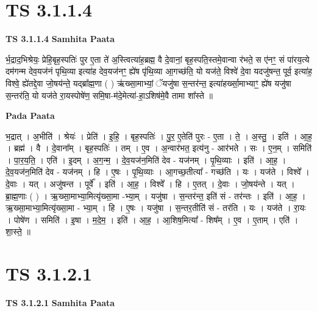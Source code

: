 \documentclass[17pt]{extarticle}
\begin{document}
\section*{ TS 3.1.1.4 }

\textbf{TS 3.1.1.4 } \newline
\textbf{Samhita Paata} \newline

र्भ॒द्राद॒भिश्रेयः॒ प्रेहि॒बृह॒स्पतिः॑ पुर ए॒ता ते॑ अ॒स्त्वित्या॑ह॒ब्रह्म॒ वै दे॒वानां॒ बृह॒स्पति॒स्तमे॒वान्वा र॑भते॒ स ए॑नꣳ॒॒ सं पा॑रय॒त्ये दम॑गन्म देव॒यज॑नं पृथि॒व्या इत्या॑ह देव॒यज॑नꣳ॒॒ ह्ये॑ष पृ॑थि॒व्या आ॒गच्छ॑ति॒ यो यज॑ते॒ विश्वे॑ दे॒वा यदजु॑षन्त॒ पूर्व॒ इत्या॑ह॒ विश्वे॒ ह्ये॑तद्दे॒वा जो॒षय॑न्ते॒ यद्ब्रा᳚ह्म॒णा ( ) ऋ॑ख्सा॒माभ्यां॒ ॅयजु॑षा स॒न्तर॑न्त॒ इत्या॑हर्ख्सा॒माभ्याꣳ॒॒ ह्ये॑ष यजु॑षा स॒न्तर॑ति॒ यो यज॑ते रा॒यस्पोषे॑ण॒ समि॒षा-म॑दे॒मेत्या॑-हा॒ऽशिष॑मे॒वै तामा शा᳚स्ते ॥ \newline

\textbf{Pada Paata} \newline

भ॒द्रात् । अ॒भीति॑ । श्रेयः॑ । प्रेति॑ । इ॒हि॒ । बृह॒स्पतिः॑ । पु॒र॒ ए॒तेति॑ पुरः - ए॒ता । ते॒ । अ॒स्तु॒ । इति॑ । आ॒ह॒ । ब्रह्म॑ । वै । दे॒वाना᳚म् । बृह॒स्पतिः॑ । तम् । ए॒व । अ॒न्वार॑भत॒ इत्य॑नु - आर॑भते । सः । ए॒न॒म् । समिति॑ । पा॒र॒य॒ति॒ । एति॑ । इ॒दम् । अ॒ग॒न्म॒ । दे॒व॒यज॑न॒मिति॑ देव - यज॑नम् । पृ॒थि॒व्याः । इति॑ । आ॒ह॒ । दे॒व॒यज॑न॒मिति॑ देव - यज॑नम् । हि । ए॒षः । पृ॒थि॒व्याः । आ॒गच्छ॒तीत्या᳚ - गच्छ॑ति । यः । यज॑ते । विश्वे᳚ । दे॒वाः । यत् । अजु॑षन्त । पूर्वे᳚ । इति॑ । आ॒ह॒ । विश्वे᳚ । हि । ए॒तत् । दे॒वाः । जो॒षय॑न्ते । यत् । ब्रा॒ह्म॒णाः ( ) । ऋ॒ख्सा॒माभ्या॒मित्यृ॑ख्सा॒मा -भ्या॒म् । यजु॑षा । स॒न्तर॑न्त॒ इति॑ सं - तर॑न्तः । इति॑ । आ॒ह॒ । ऋ॒ख्सा॒माभ्या॒मित्यृ॑ख्सा॒मा - भ्या॒म् । हि । ए॒षः । यजु॑षा । स॒न्तर॒तीति॑ सं - तर॑ति । यः । यज॑ते । रा॒यः । पोषे॑ण । समिति॑ । इ॒षा । म॒दे॒म॒ । इति॑ । आ॒ह॒ । आ॒शिष॒मित्या᳚ - शिष᳚म् । ए॒व । ए॒ताम् । एति॑ । शा॒स्ते॒ ॥  \newline




\section*{ TS 3.1.2.1 }

\textbf{TS 3.1.2.1 } \newline
\textbf{Samhita Paata} \newline
\end{document}
